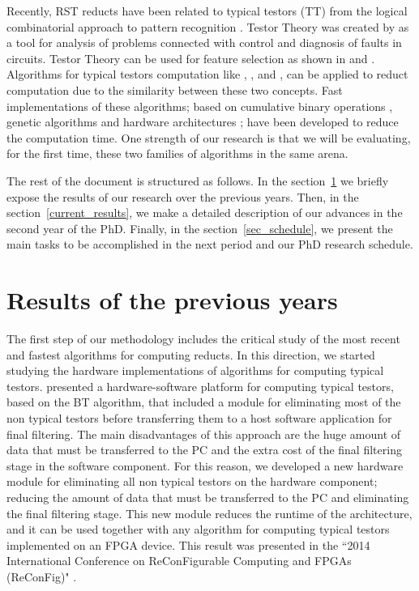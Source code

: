 \documentclass[authoryear,11pt]{elsarticle}
\begin{document}
  Recently, RST reducts have been related to typical testors (TT) from the logical combinatorial approach 
  to pattern recognition \citep{Lazo15}. Testor Theory was created by \cite{Cheguis55} as a tool for analysis of 
  problems connected with control and diagnosis of faults in circuits. 
  Testor Theory can be used for feature selection as shown in \citep{Ruiz08} and \citep{Martinez01}. Algorithms for
  typical testors computation like \citep{Ruiz85}, \citep{Santiesteban03}, \citep{Sanchez07} 
  and \citep{Lias09}, can be applied to reduct computation due to the similarity between these two concepts. 
  Fast implementations of these algorithms; based on cumulative binary operations \citep{Sanchez10}, genetic 
  algorithms \citep{Sanchez99} and hardware architectures \citep{Rojas12}; have been developed to reduce the
  computation time. One strength of our research is that we will be evaluating, for the first time, these two 
  families of algorithms in the same arena.
  
  
  The rest of the document is structured as follows. In the section~\ref{previous_results} we briefly expose the results of our research over the previous years. Then, in the section~\ref{current_results}, we make a detailed description of our advances in the second year of the PhD. Finally, in the section~\ref{sec_schedule}, we present the main tasks to be accomplished in the next period and our PhD research schedule.
  
  \section{Results of the previous years}\label{previous_results}
  
  The first step of our methodology includes the critical study of the most recent and fastest algorithms for computing reducts. In this direction, we started studying the hardware implementations of algorithms for computing typical testors. \cite{Rojas12} presented a hardware-software platform for computing typical testors, based on the BT algorithm, that included a module for eliminating most of the non typical testors before transferring them to a host software application for final filtering. The main disadvantages of this approach are the huge amount of data that must be transferred to the PC and the extra cost of the final filtering stage in the software component.  For this reason, we developed a new hardware module for eliminating all non typical testors on the hardware	component; reducing the amount of data that must be transferred to the PC and eliminating the final filtering	stage. 	This new module reduces the runtime of the architecture, and it can be used together with any algorithm for computing typical testors implemented on an FPGA device. This result was presented in the ``2014 International Conference on ReConFigurable Computing and FPGAs (ReConFig)"  \citep{Rodriguez14}. 
  
\end{document}
